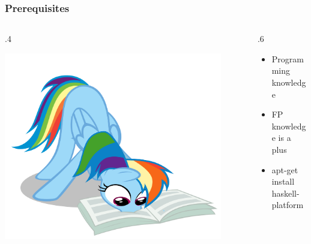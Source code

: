 \documentclass[17pt]{beamer}
\renewcommand{\(}[1]{\begin{columns}[#1]}
\renewcommand{\)}{\end{columns}}
\newcommand{\<}[1]{\begin{column}{#1}}
\renewcommand{\>}{\end{column}}
\begin{document}
\begin{frame}
  \frametitle{Prerequisites}
  \({c}
  \<{.4\textwidth}
  \begin{center}
    \includegraphics[width=0.9\textwidth]{img/dash_reading}
  \end{center}
  \>
  \<{.6\textwidth}
  \begin{center}
  \begin{itemize}
    \item Programming knowledge
    \item FP knowledge is a plus
    \item apt-get install haskell-platform
  \end{itemize}
  \end{center}
  \>
  \)
\end{frame}
\end{document}

